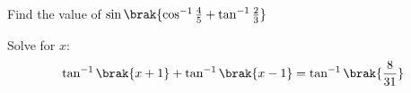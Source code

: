 \item Find the value of $\sin\brak{\cos^{-1}{\frac{4}{5}}+{\tan^{-1}{\frac{2}{3}}}}$
\hfill{}\item Solve for $x$:
	\begin{align*}
	\tan^{-1}\brak{x+1}+\tan^{-1}\brak{x-1}=\tan^{-1}\brak{\dfrac{8}{31}}
	\end{align*}
\hfill{}

